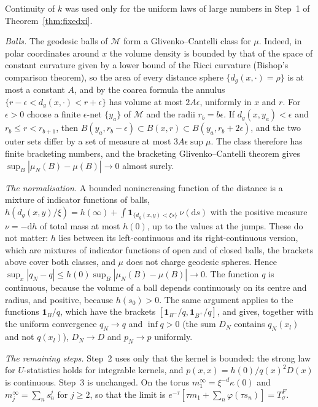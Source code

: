 \documentclass[11pt,a4paper]{article}
\makeatletter
\theoremstyle{stmt}
\theoremstyle{defn}
\theoremstyle{rmk}
\renewenvironment{proof}[1][\proofname]{\par\pushQED{\qed}\normalfont\topsep6\p@\@plus6\p@\relax
  \trivlist\item[\hskip\labelsep{\sffamily\itshape\small #1.}]\ignorespaces}{\popQED\endtrivlist\@endpefalse}
\numberwithin{equation}{section}
\newcommand{\M}{\mathcal{M}}
\newcommand{\dd}{\mathrm{d}}
\makeatother
\begin{document}
{\begin{proof}
Continuity of $k$ was used only for the uniform laws of large numbers in Step~1 of Theorem~\ref{thm:fixedxi}.

\emph{Balls.} The geodesic balls of $\M$ form a Glivenko--Cantelli class for $\mu$. Indeed, in polar coordinates around $x$ the volume density is bounded by that of the space of constant curvature given by a lower bound of the Ricci curvature (Bishop's comparison theorem), so the area of every distance sphere $\{d_g(x,\cdot)=\rho\}$ is at most a constant $A$, and by the coarea formula the annulus $\{r-\epsilon<d_g(x,\cdot)<r+\epsilon\}$ has volume at most $2A\epsilon$, uniformly in $x$ and $r$. For $\epsilon>0$ choose a finite $\epsilon$-net $\{y_a\}$ of $\M$ and the radii $r_b=b\epsilon$. If $d_g(x,y_a)<\epsilon$ and $r_b\le r<r_{b+1}$, then $B(y_a,r_b-\epsilon)\subset B(x,r)\subset B(y_a,r_b+2\epsilon)$, and the two outer sets differ by a set of measure at most $3A\epsilon\sup\mu$. The class therefore has finite bracketing numbers, and the bracketing Glivenko--Cantelli theorem \cite[Theorem~2.4.1]{vdVW} gives $\sup_B|\mu_N(B)-\mu(B)|\to0$ almost surely.

\emph{The normalisation.} A bounded nonincreasing function of the distance is a mixture of indicator functions of balls, $h(d_g(x,y)/\xi)=h(\infty)+\int\mathbf 1_{\{d_g(x,y)<\xi s\}}\,\nu(\dd s)$ with the positive measure $\nu=-\dd h$ of total mass at most $h(0)$, up to the values at the jumps. These do not matter: $h$ lies between its left-continuous and its right-continuous version, which are mixtures of indicator functions of open and of closed balls, the brackets above cover both classes, and $\mu$ does not charge geodesic spheres. Hence $\sup_x|q_N-q|\le h(0)\sup_B|\mu_N(B)-\mu(B)|\to0$. The function $q$ is continuous, because the volume of a ball depends continuously on its centre and radius, and positive, because $h(s_0)>0$. The same argument applies to the functions $\mathbf 1_B/q$, which have the brackets $[\mathbf 1_{B^-}/q,\mathbf 1_{B^+}/q]$, and gives, together with the uniform convergence $q_N\to q$ and $\inf q>0$ (the sum $D_N$ contains $q_N(x_l)$ and not $q(x_l)$), $D_N\to D$ and $p_N\to p$ uniformly.

\emph{The remaining steps.} Step~2 uses only that the kernel is bounded: the strong law for $U$-statistics holds for integrable kernels, and $p(x,x)=h(0)/q(x)^2D(x)$ is continuous. Step~3 is unchanged. On the torus $m_1^\infty=\xi^{-d}\kappa(0)$ and $m_j^\infty=\sum_ns_n^j$ for $j\ge2$, so that the limit is $e^{-\tau}[\tau m_1+\sum_n\varphi(\tau s_n)]=T^F_\sigma$.
\end{proof}

}
\end{document}
